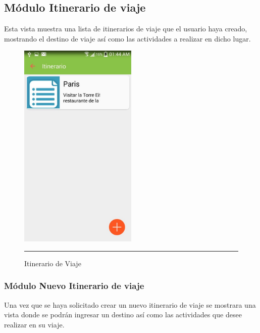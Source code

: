 \subsection{Módulo Itinerario de viaje}
Esta vista muestra una lista de itinerarios de viaje que el usuario haya creado, 
mostrando el destino de viaje así como las actividades a realizar en dicho lugar.

\begin{figure}[h]
	\centering
		\includegraphics[width=0.5\textwidth]{Figuras/itinerario.jpg}
		\rule{30em}{0.5pt}
	\caption[Itinerario de viaje]{Itinerario de Viaje}
	\label{fig:itinerario}
\end{figure}
\clearpage

\subsubsection{Módulo Nuevo Itinerario de viaje}
Una vez que se haya solicitado crear un nuevo itinerario de viaje se mostrara una vista donde se podrán ingresar un destino así como las actividades que desee realizar en su viaje.


